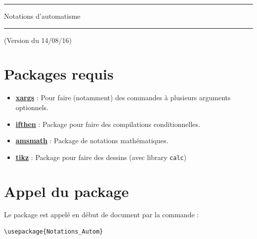 \documentclass[a4paper,10pt]{article}
\newcommand{\rac}{({\color{red}Raccourci})}
\newcommand{\ren}{({\color{blue}Renommé})}
\begin{document}
	\begin{center}
		\hrule{\Large Notations d'automatisme}\\\hrule
	\end{center}
	(Version du 14/08/16)

	\section{Packages requis}

		\begin{itemize}
			\item \href{https://www.ctan.org/pkg/xargs}{\textbf{xargs}} : Pour faire (notamment) des commandes à plusieurs arguments optionnels.
			\item \href{https://www.ctan.org/pkg/ifthen}{\textbf{ifthen}} : Package pour faire des compilations conditionnelles.
			\item \href{http://www.ams.org/publications/authors/tex/amslatex}{\textbf{amsmath}} : Package de notations mathématiques.
			\item \href{http://www.ctan.org/pkg/pgf}{\textbf{tikz}} : Package pour faire des dessins (avec library \verb!calc!)
		\end{itemize}

	\section{Appel du package}

		Le package est appelé en début de document par la commande :
		\begin{verbatim}
\usepackage{Notations_Autom}
		\end{verbatim}

		
		
% 
\end{document}
